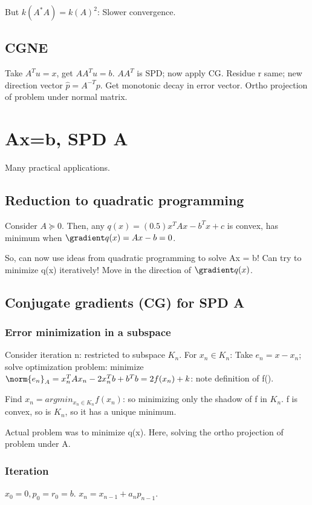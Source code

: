 \documentclass[oneside, article]{memoir}
\begin{document}
But $k(A^{*}A) = k(A)^{2}$: Slower convergence.

\section{CGNE}
Take $A^{T}u = x$, get $AA^{T}u = b$. $AA^{T}$ is SPD; now apply CG. Residue r same; new direction vector $\hat{p} = A^{-T}p$. Get monotonic decay in error vector. Ortho projection of problem under normal matrix.

\chapter{Ax=b, SPD A}
Many practical applications.

\section{Reduction to quadratic programming}
Consider $A \succeq 0$. Then, any $q(x) = (0.5) x^{T}Ax - b^{T}x + c$ is convex, has minimum when $\gradient q(x) = Ax - b = 0$.

So, can now use ideas from quadratic programming to solve Ax = b! Can try to minimize q(x) iteratively! Move in the direction of $\gradient q(x)$.

\section{Conjugate gradients (CG) for SPD A}
\subsection{Error minimization in a subspace}
Consider iteration n: restricted to subspace $K_n$. For $x_n \in K_n$: Take $e_{n} = x - x_{n}$; solve optimization problem: minimize $\norm{e_{n}}_{A} = x_{n}^{T}Ax_{n} - 2x_{n}^{T}b + b^{T}b = 2f(x_{n}) + k$: note definition of f().

Find $x_{n} = argmin_{x_{n} \in K_{n}} f(x_{n})$: so minimizing only the shadow of f in $K_{n}$. f is convex, so is $K_n$, so it has a unique minimum.

Actual problem was to minimize q(x). Here, solving the ortho projection of problem under A.

\subsection{Iteration}
$x_{0} = 0, p_{0} = r_{0} = b$. $x_{n} = x_{n-1} + a_{n}p_{n-1}$.
\end{document}
